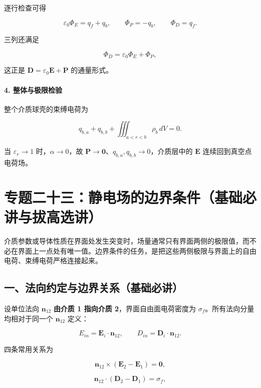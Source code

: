 逐行检查可得

\[
\varepsilon_0\Phi_E=q_f+q_b,
\qquad
\Phi_P=-q_b,
\qquad
\Phi_D=q_f.
\]

三列还满足

\[
\boxed{\Phi_D=\varepsilon_0\Phi_E+\Phi_P},
\]

这正是 \(\mathbf D=\varepsilon_0\mathbf E+\mathbf P\) 的通量形式。

\paragraph{4.
整体与极限检验}\label{m3:ux6574ux4f53ux4e0eux6781ux9650ux68c0ux9a8c}

整个介质球壳的束缚电荷为

\[
q_{b,a}+q_{b,b}+\iiint_{a<r<b}\rho_b\,dV=0.
\]

当 \(\varepsilon_r\to1\) 时，\(\alpha\to0\)，故
\(\mathbf P\to\mathbf0\)、\(q_{b,a},q_{b,b}\to0\)，介质层中的
\(\mathbf E\) 连续回到真空点电荷场。

\section{专题二十三：静电场的边界条件（基础必讲与拔高选讲）}\label{m3:ux4e13ux9898ux4e8cux5341ux4e09ux9759ux7535ux573aux7684ux8fb9ux754cux6761ux4ef6ux57faux7840ux5fc5ux8bb2ux4e0eux62d4ux9ad8ux9009ux8bb2}

介质参数或导体性质在界面处发生突变时，场量通常只有界面两侧的极限值，而不必在界面上一点处有唯一值。边界条件的任务，是把这些两侧极限与界面上的自由电荷、束缚电荷严格连接起来。

\subsection{一、法向约定与边界关系（基础必讲）}\label{m3:ux4e00ux6cd5ux5411ux7ea6ux5b9aux4e0eux8fb9ux754cux5173ux7cfbux57faux7840ux5fc5ux8bb2}

设单位法向 \(\mathbf n_{12}\) \textbf{由介质 1 指向介质
2}，界面自由面电荷密度为 \(\sigma_f\)。所有法向分量均相对于同一个
\(\mathbf n_{12}\) 定义：

\[
E_{in}=\mathbf E_i\cdot\mathbf n_{12},
\qquad
D_{in}=\mathbf D_i\cdot\mathbf n_{12}.
\]

四条常用关系为

\[
\boxed{\mathbf n_{12}\times(\mathbf E_2-\mathbf E_1)=\mathbf0},
\]

\[
\boxed{\mathbf n_{12}\cdot(\mathbf D_2-\mathbf D_1)=\sigma_f},
\]

